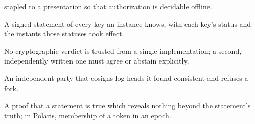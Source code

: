 \begin{description}
    stapled to a presentation so that authorization is decidable offline.
  \item[Trust list.] A signed statement of every key an instance knows, with each key's status and
    the instants those statuses took effect.
  \item[Two-witness principle.] No cryptographic verdict is trusted from a single implementation; a
    second, independently written one must agree or abstain explicitly.
  \item[Witness.] An independent party that cosigns log heads it found consistent and refuses a fork.
  \item[Zero-knowledge proof.] A proof that a statement is true which reveals nothing beyond the
    statement's truth; in Polaris, membership of a token in an epoch.
\end{description}
